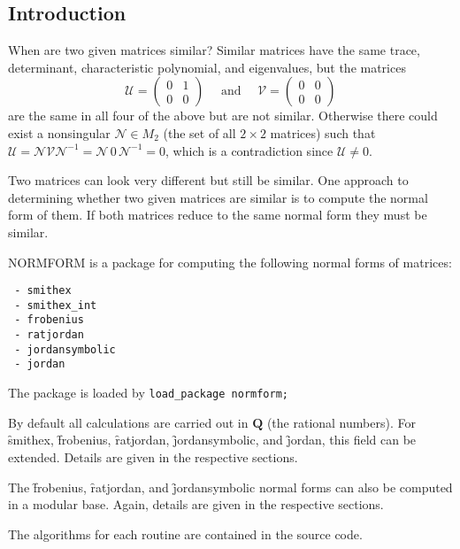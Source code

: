 \subsection{Introduction}
\ifdefined{}\else
\newcommand{\rank}{\mathop{\mathrm{rank}}}
\fi
When are two given matrices similar? Similar matrices have the same
trace, determinant, characteristic polynomial,
and eigenvalues, but the matrices
\[
 \mathcal{U} = \begin{pmatrix} 0 & 1 \\ 0 & 0 \end{pmatrix}
  \quad\text{ and } \quad
 \mathcal{V} = \begin{pmatrix} 0 & 0 \\ 0 & 0 \end{pmatrix}
\]
are the same in all four of the above but are not similar. Otherwise
there could exist a nonsingular $\mathcal{ N} {\in} M_{2}$ (the set of
all $2 \times 2$ matrices) such that $\mathcal{U} = \mathcal{N} \mathcal{V}
\mathcal{N}^{-1} = \mathcal{N} \, \mathit{0} \, \mathcal{N}^{-1} = \mathit{0}$,
which is a contradiction since $\mathcal{U} \neq \mathit{0}$.

Two matrices can look very different but still be similar. One
approach to determining whether two given matrices are similar is to
compute the normal form of them. If both matrices reduce to the same
normal form they must be similar.

{\small NORMFORM} is a package for computing the following normal
forms of matrices:

\begin{verbatim}
 - smithex
 - smithex_int
 - frobenius
 - ratjordan
 - jordansymbolic
 - jordan
\end{verbatim}

The package is loaded by \texttt{load\_package normform;}

By default all calculations are carried out in $\mathbf{Q}$ (the rational
numbers). For \f{smithex}, \f{frobenius}, \f{ratjordan},
\f{jordansymbolic}, and \f{jordan}, this field can be extended.
Details are given in the respective sections.

The \f{frobenius}, \f{ratjordan}, and \f{jordansymbolic} normal
forms can also be computed in a modular base. Again, details are given
in the respective sections.

The algorithms for each routine are contained in the source code.

